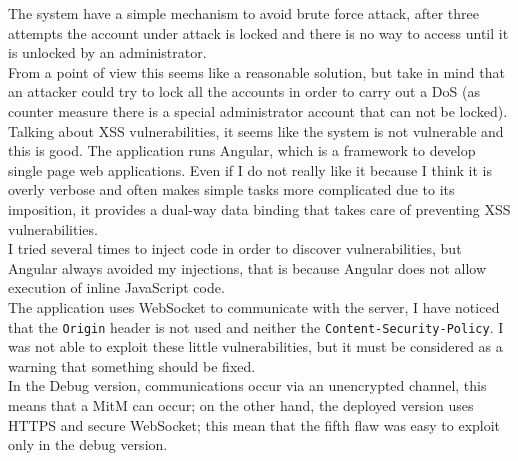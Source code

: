 The system have a simple mechanism to avoid brute force attack, after three attempts the account under attack is locked and there is no way to access
until it is unlocked by an administrator.\\
From a point of view this seems like a reasonable solution, but take in mind that an attacker could try to lock all the accounts in order to carry out
a DoS (as counter measure there is a special administrator account that can not be locked).\\
Talking about XSS vulnerabilities, it seems like the system is not vulnerable and this is good. The application runs Angular, which is a
framework to develop single page web applications. Even if I do not really like it because I think it is overly verbose and often makes simple tasks more complicated due to its imposition, it provides a dual-way data binding that takes care of preventing XSS vulnerabilities.\\
I tried several times to inject code in order to discover vulnerabilities, but Angular always avoided my injections, that is because Angular
does not allow execution of inline JavaScript code.\\

The application uses WebSocket to communicate with the server, I have noticed that the \texttt{Origin} header is not used and neither the \texttt{Content-Security-Policy}. I was not able to exploit these little vulnerabilities, but it must be considered as a warning that something
should be fixed.\\
In the Debug version, communications occur via an unencrypted channel, this means that a MitM can occur; on the other hand,
the deployed version uses HTTPS and secure WebSocket; this mean that the fifth flaw was easy to exploit only in the debug version.

